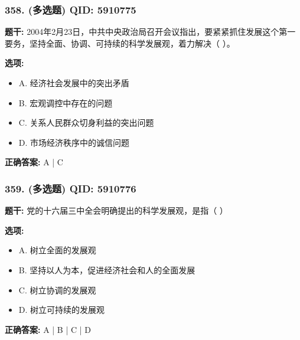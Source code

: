 \documentclass[12pt,UTF8]{ctexart}
\begin{document}
\subsubsection*{358. (多选题) \small QID: 5910775}

\textbf{题干:}
2004年2月23日，中共中央政治局召开会议指出，要紧紧抓住发展这个第一要务，坚持全面、协调、可持续的科学发展观，着力解决（ ）。

\textbf{选项:}
\begin{itemize}[leftmargin=*]

  \item A. 经济社会发展中的突出矛盾

  \item B. 宏观调控中存在的问题

  \item C. 关系人民群众切身利益的突出问题

  \item D. 市场经济秩序中的诚信问题

\end{itemize}

\textbf{正确答案:}
A | C

\vspace{0.3em}\hrulefill\vspace{0.7em}

\subsubsection*{359. (多选题) \small QID: 5910776}

\textbf{题干:}
党的十六届三中全会明确提出的科学发展观，是指（ ）

\textbf{选项:}
\begin{itemize}[leftmargin=*]

  \item A. 树立全面的发展观

  \item B. 坚持以人为本，促进经济社会和人的全面发展

  \item C. 树立协调的发展观

  \item D. 树立可持续的发展观

\end{itemize}

\textbf{正确答案:}
A | B | C | D

\vspace{0.3em}\hrulefill\vspace{0.7em}
\end{document}
